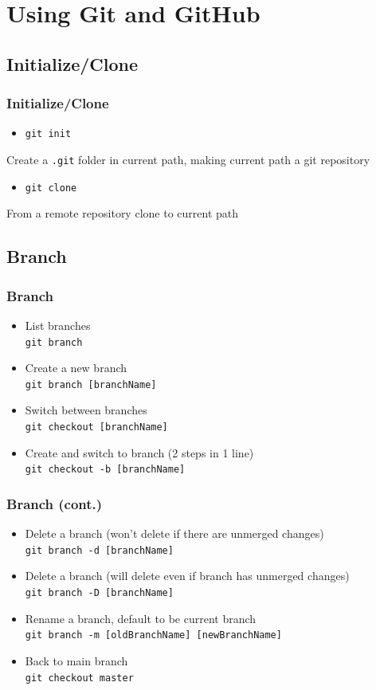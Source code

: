 \documentclass{beamer}
\begin{document}
	\section{Using Git and GitHub}
		\subsection{Initialize/Clone}
			\begin{frame}
				\frametitle{Initialize/Clone}
				\begin{itemize}
					\item \texttt{git init}
				\end{itemize}
				Create a \texttt{.git} folder in current path, making current path a git repository

				\begin{itemize}
					\item \texttt{git clone}
				\end{itemize}
				From a remote repository clone to current path
			\end{frame}

		\subsection{Branch}
			\begin{frame}
				\frametitle{Branch}
				\begin{itemize}
					\item List branches\\
						\texttt{git branch}
					\item Create a new branch\\
						\texttt{git branch [branchName]}
					\item Switch between branches\\
						\texttt{git checkout [branchName]}
					\item Create and switch to branch (2 steps in 1 line)\\
						\texttt{git checkout -b [branchName]}
				\end{itemize}
			\end{frame}

			\begin{frame}
				\frametitle{Branch (cont.)}
				\begin{itemize}						
					\item Delete a branch (won't delete if there are unmerged changes)\\
						\texttt{git branch -d [branchName]}
					\item Delete a branch (will delete even if branch has unmerged changes)\\
						\texttt{git branch -D [branchName]}
					\item Rename a branch, default to be current branch\\
						\texttt{git branch -m [oldBranchName] [newBranchName]}
					\item Back to main branch\\
						\texttt{git checkout master}
				\end{itemize}
			\end{frame}
\end{document}

